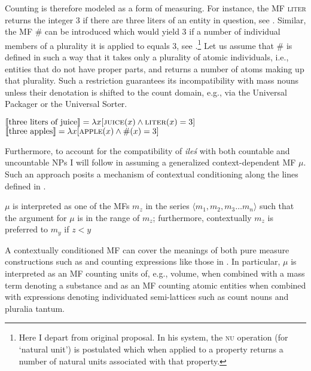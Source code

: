 \documentclass[output=paper,
]{langscibook}
\begin{document}
	\noindent Counting is therefore modeled as a form of measuring. For instance, the MF \textsc{liter} returns the integer 3 if there are three liters of an entity in question, see . Similar, the MF \# can be introduced which would yield 3 if a number of individual members of a plurality it is applied to equals 3, see .\footnote{Here I depart from  original proposal. In his system, the \textsc{nu} operation (for `natural unit') is postulated which when applied to a property returns a number of natural units associated with that property.} Let us assume that \# is defined in such a way that it takes only a plurality of atomic individuals, i.e., entities that do not have proper parts, and returns a number of atoms making up that plurality. Such a restriction guarantees its incompatibility with mass nouns unless their denotation is shifted to the count domain, e.g., via the Universal Packager or the Universal Sorter. 
	
	\ea \ea $\llbracket\text{three liters of juice}\rrbracket=\lambda x[\textsc{juice}(x) \wedge \textsc{liter}(x)=3]$\label{ex:mf-liter}
	\ex $\llbracket\text{three apples}\rrbracket=\lambda x[\textsc{apple}(x) \wedge \#(x)=3]$\label{ex:mf-cardinality}
	\z
    \z
	
	\noindent Furthermore, to account for the compatibility of \textit{ileś} with both countable and uncountable NPs I will follow \cite{bale_barner2009interpretation} in assuming a generalized context-dependent MF $\mu$. Such an approach posits a mechanism of contextual conditioning along the lines defined in .

    \ea $\mu$ is interpreted as one of the MFs $m_z$ in the series $\langle m_1, m_2, m_3\dots m_n\rangle$ such that the argument for $\mu$ is in the range of $m_z$; furthermore, contextually $m_z$ is preferred to $m_y$ if $z<y$\label{ex:contextual-conditioning-mf}
    \z


    
    \noindent A contextually conditioned MF can cover the meanings of both pure measure constructions such as  and counting expressions like those in . In particular, $\mu$ is interpreted as an MF counting units of, e.g., volume, when combined with a mass term denoting a substance and as an MF counting atomic entities when combined with expressions denoting individuated semi-lattices such as count nouns and pluralia tantum.
    
\end{document}
